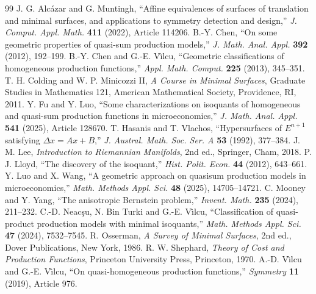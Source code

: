 \documentclass[preprint,12pt]{elsarticle}
\numberwithin{equation}{section}
\theoremstyle{definition}\newtheorem{definition}[theorem]{Definition}
\theoremstyle{remark}\newtheorem{remark}[theorem]{Remark}
\begin{document}
\begin{thebibliography}{99}
 J. G. Alc\'azar and G. Muntingh, ``Affine equivalences of surfaces of translation and minimal surfaces, and applications to symmetry detection and design,'' \emph{J. Comput. Appl. Math.} \textbf{411} (2022), Article 114206.
 B.-Y. Chen, ``On some geometric properties of quasi-sum production models,'' \emph{J. Math. Anal. Appl.} \textbf{392} (2012), 192--199.
 B.-Y. Chen and G.-E. V\^{\i}lcu, ``Geometric classifications of homogeneous production functions,'' \emph{Appl. Math. Comput.} \textbf{225} (2013), 345--351.
 T. H. Colding and W. P. Minicozzi II, \emph{A Course in Minimal Surfaces}, Graduate Studies in Mathematics 121, American Mathematical Society, Providence, RI, 2011.
 Y. Fu and Y. Luo, ``Some characterizations on isoquants of homogeneous and quasi-sum production functions in microeconomics,'' \emph{J. Math. Anal. Appl.} \textbf{541} (2025), Article 128670.
 T. Hasanis and T. Vlachos, ``Hypersurfaces of $E^{n+1}$ satisfying $\Delta x=Ax+B$,'' \emph{J. Austral. Math. Soc. Ser. A} \textbf{53} (1992), 377--384.
 J. M. Lee, \emph{Introduction to Riemannian Manifolds}, 2nd ed., Springer, Cham, 2018.
 P. J. Lloyd, ``The discovery of the isoquant,'' \emph{Hist. Polit. Econ.} \textbf{44} (2012), 643--661.
 Y. Luo and X. Wang, ``A geometric approach on quasisum production models in microeconomics,'' \emph{Math. Methods Appl. Sci.} \textbf{48} (2025), 14705--14721.
 C. Mooney and Y. Yang, ``The anisotropic Bernstein problem,'' \emph{Invent. Math.} \textbf{235} (2024), 211--232.
 C.-D. Neac\c{s}u, N. Bin Turki and G.-E. V\^{\i}lcu, ``Classification of quasi-product production models with minimal isoquants,'' \emph{Math. Methods Appl. Sci.} \textbf{47} (2024), 7532--7545.
 R. Osserman, \emph{A Survey of Minimal Surfaces}, 2nd ed., Dover Publications, New York, 1986.
 R. W. Shephard, \emph{Theory of Cost and Production Functions}, Princeton University Press, Princeton, 1970.
 A.-D. V\^{\i}lcu and G.-E. V\^{\i}lcu, ``On quasi-homogeneous production functions,'' \emph{Symmetry} \textbf{11} (2019), Article 976.
\end{thebibliography}
\end{document}
